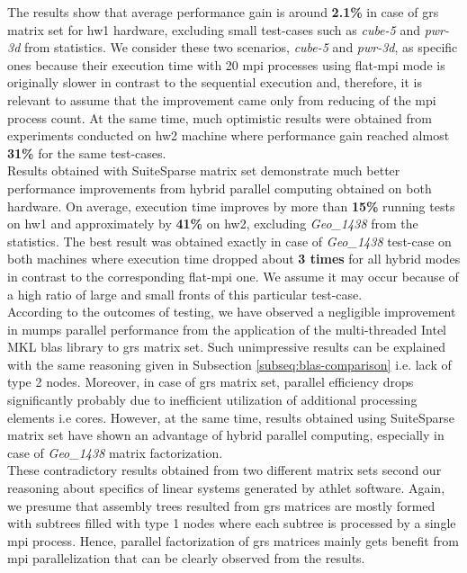 The results show that average performance gain is around \textbf{2.1\%} in case of \acrshort{grs} matrix set for \gls{hw1} hardware, excluding small test-cases such as \textit{cube-5} and \textit{pwr-3d} from statistics. We consider these two scenarios, \textit{cube-5} and \textit{pwr-3d}, as specific ones because their execution time with 20 \acrshort{mpi} processes using flat-\acrshort{mpi} mode is originally slower in contrast to the sequential execution and, therefore, it is relevant to assume that the improvement came only from reducing of the \acrshort{mpi} process count. At the same time, much optimistic results were obtained from experiments conducted on \gls{hw2} machine where performance gain reached almost \textbf{31\%} for the same test-cases.\\



Results obtained with SuiteSparse matrix set demonstrate much better performance improvements from hybrid parallel computing obtained on both hardware. On average, execution time improves by more than \textbf{15\%} running tests on \gls{hw1} and approximately by \textbf{41\%} on \gls{hw2}, excluding \textit{Geo\_1438} from the statistics. The best result was obtained exactly in case of \textit{Geo\_1438} test-case on both machines where execution time dropped about \textbf{3 times} for all hybrid modes in contrast to the corresponding flat-\acrshort{mpi} one. We assume it may occur because of a high ratio of large and small fronts of this particular test-case.\\


According to the outcomes of testing, we have observed a negligible improvement in \acrshort{mumps} parallel performance from the application of the multi-threaded Intel MKL \acrshort{blas} library to \acrshort{grs} matrix set. Such unimpressive results can be explained with the same reasoning given in Subsection \ref{subseq:blas-comparison} i.e. lack of type 2 nodes. Moreover, in case of \acrshort{grs} matrix set, parallel efficiency drops significantly probably due to inefficient utilization of additional processing elements i.e cores. However, at the same time, results obtained using SuiteSparse matrix set have shown an advantage of hybrid parallel computing, especially in case of \textit{Geo\_1438} matrix factorization.\\


These contradictory results obtained from two different matrix sets second our reasoning about specifics of linear systems generated by \acrshort{athlet} software. Again, we presume that assembly trees resulted from \acrshort{grs} matrices are mostly formed with subtrees filled with type 1 nodes where each subtree is processed by a single \acrshort{mpi} process. Hence, parallel factorization of \acrshort{grs} matrices mainly gets benefit from \acrshort{mpi} parallelization that can be clearly observed from the results.\\



